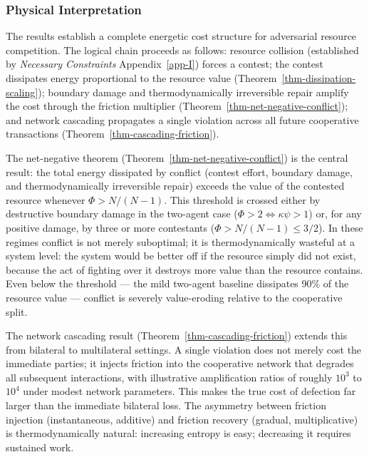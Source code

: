 \documentclass[11pt]{article}
\theoremstyle{plain}
\theoremstyle{definition}
\theoremstyle{remark}
\let\origsubsubsection\subsubsection
\renewcommand{\subsubsection}{\needspace{4\baselineskip}\origsubsubsection}
\begin{document}
\subsubsection{Physical Interpretation}\label{physical-interpretation-4}

The results establish a complete energetic cost structure for
adversarial resource competition. The logical chain proceeds as follows:
resource collision (established by \emph{Necessary Constraints}
Appendix~\ref{app-I}) forces a contest; the contest dissipates energy
proportional to the resource value
(Theorem~\ref{thm-dissipation-scaling}); boundary damage and
thermodynamically irreversible repair amplify the cost through the
friction multiplier (Theorem~\ref{thm-net-negative-conflict}); and
network cascading propagates a single violation across all future
cooperative transactions (Theorem~\ref{thm-cascading-friction}).

The net-negative theorem (Theorem~\ref{thm-net-negative-conflict}) is
the central result: the total energy dissipated by conflict (contest
effort, boundary damage, and thermodynamically irreversible repair)
exceeds the value of the contested resource whenever \(\Phi > N/(N-1)\).
This threshold is crossed either by destructive boundary damage in the
two-agent case (\(\Phi > 2 \Leftrightarrow \kappa\psi > 1\)) or, for any
positive damage, by three or more contestants
(\(\Phi > N/(N-1) \leq 3/2\)). In these regimes conflict is not merely
suboptimal; it is thermodynamically wasteful at a system level: the
system would be better off if the resource simply did not exist, because
the act of fighting over it destroys more value than the resource
contains. Even below the threshold --- the mild two-agent baseline
dissipates 90\% of the resource value --- conflict is severely
value-eroding relative to the cooperative split.

The network cascading result (Theorem~\ref{thm-cascading-friction})
extends this from bilateral to multilateral settings. A single violation
does not merely cost the immediate parties; it injects friction into the
cooperative network that degrades all subsequent interactions, with
illustrative amplification ratios of roughly \(10^3\) to \(10^4\) under
modest network parameters. This makes the true cost of defection far
larger than the immediate bilateral loss. The asymmetry between friction
injection (instantaneous, additive) and friction recovery (gradual,
multiplicative) is thermodynamically natural: increasing entropy is
easy; decreasing it requires sustained work.
\end{document}
